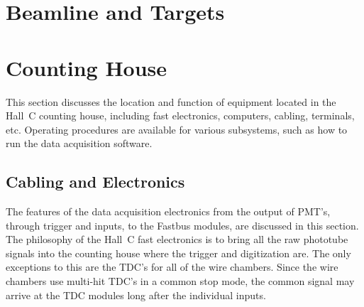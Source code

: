 %
%

\section{Beamline and Targets}




\section{Counting House}

This section discusses the location and function of equipment located in the
Hall~C counting house, including fast electronics, computers, cabling,
terminals, etc.
Operating procedures are available for various subsystems, such as how to
run the data acquisition software.

\subsection{Cabling and Electronics}

The features of the data acquisition
electronics from the output of PMT's, through trigger and inputs, to
the Fastbus modules, are discussed in this section.
The philosophy of the Hall~C fast electronics is to bring all the
raw phototube signals into the counting house where the trigger and
digitization are. The only exceptions to this are the TDC's for all of
the wire chambers. Since the wire chambers use multi-hit TDC's in a
common stop mode, the common signal may arrive at the TDC modules long
after the individual inputs.

